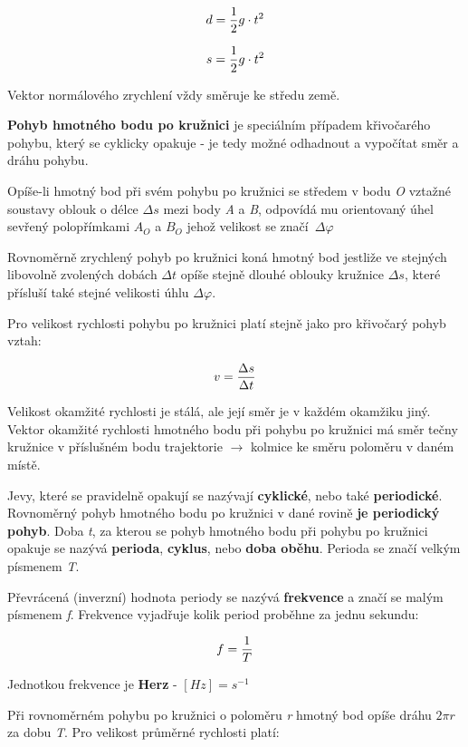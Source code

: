 $$ d = {1\over 2}g\cdot t^2 $$

$$ s = {1\over 2}g\cdot t^2 $$

Vektor normálového zrychlení vždy směruje ke středu země.


{\bf Pohyb hmotného bodu po kružnici} je speciálním případem křivočarého pohybu, který se cyklicky opakuje - je tedy možné odhadnout a vypočítat směr a dráhu pohybu.

Opíše-li hmotný bod při svém pohybu po kružnici se středem v bodu {\it O} vztažné soustavy oblouk o délce $\Delta s$ mezi body {\it A} a {\it B}, odpovídá mu orientovaný úhel sevřený polopřímkami $A_O$ a $B_O$ jehož velikost se značí~$\Delta \varphi $

\vskip 4mm
\centerline{}
\vskip 4mm

Rovnoměrně zrychlený pohyb po kružnici koná hmotný bod jestliže ve stejných libovolně zvolených dobách $\Delta t$ opíše stejně dlouhé oblouky kružnice $\Delta s$, které přísluší také stejné velikosti úhlu $\Delta \varphi$.

Pro velikost rychlosti pohybu po kružnici platí stejně jako pro křivočarý pohyb vztah:

$$ v = {{\Delta s}\over {\Delta t} }$$

Velikost okamžité rychlosti je stálá, ale její směr je v každém okamžiku jiný. Vektor okamžité rychlosti hmotného bodu při pohybu po kružnici má směr tečny kružnice v příslušném bodu trajektorie $\rightarrow$ kolmice ke směru poloměru v daném místě.

\vskip 4mm
\centerline{}
\vskip 4mm

Jevy, které se pravidelně opakují se nazývají {\bf cyklické}, nebo také {\bf periodické}. Rovnoměrný pohyb hmotného bodu po kružnici v dané rovině {\bf je periodický pohyb}. Doba {\it t}, za kterou se pohyb hmotného bodu při pohybu po kružnici opakuje se nazývá {\bf perioda}, {\bf cyklus}, nebo {\bf doba oběhu}. Perioda se značí velkým písmenem {\it T}.

Převrácená (inverzní) hodnota periody se nazývá {\bf frekvence} a značí se malým písmenem {\it f}. Frekvence vyjadřuje kolik period proběhne za jednu sekundu:

$$ f = {1 \over T} $$

Jednotkou frekvence je {\bf Herz} - $[Hz] = s^{-1}$

Při rovnoměrném pohybu po kružnici o poloměru {\it r} hmotný bod opíše dráhu $2 \pi r$ za dobu {\it T}. Pro velikost průměrné rychlosti platí:

